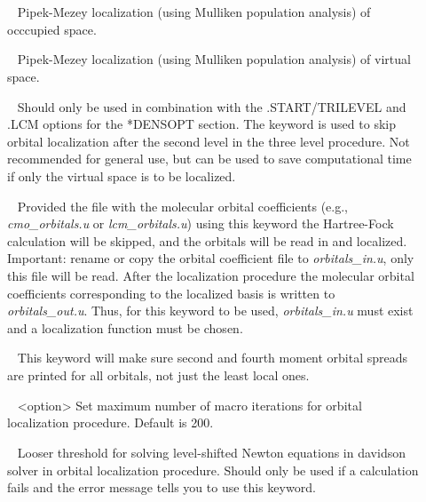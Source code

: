 \begin{description}
\item[]\verb| | \newline
Pipek-Mezey localization (using Mulliken population analysis) of occcupied space.

\item[]\verb| | \newline
Pipek-Mezey localization (using Mulliken population analysis) of virtual space.

\item[]\verb| | \newline
Should only be used in combination with the .START/TRILEVEL and  .LCM options for the *DENSOPT section. The keyword is used to skip orbital localization after the second level in the three level procedure. Not recommended for general use, but can be used to save  computational time if only the virtual space is to be localized.  

\item[]\verb| | \newline
Provided the file with the molecular orbital coefficients (e.g., \textit{cmo\_orbitals.u} or \textit{lcm\_orbitals.u}) using this keyword the Hartree-Fock calculation will be skipped, and the orbitals will be read in and localized. Important: rename or copy the orbital coefficient file to \textit{orbitals\_in.u}, only this file will be read. After the localization procedure the molecular orbital coefficients corresponding to the localized basis is written to \textit{orbitals\_out.u}. Thus, for this keyword to be used, \textit{orbitals\_in.u} must exist and a localization function must be chosen.


\item[]\verb| | \newline
This keyword will make sure second and fourth moment orbital spreads are printed for all orbitals, not just the least local ones.


\item[]\verb| | \newline
<option>
Set maximum number of macro iterations for orbital localization procedure. Default is 200. 


\item[]\verb| | \newline
Looser threshold for solving level-shifted Newton equations in davidson solver in orbital localization procedure. Should only be used if a calculation fails and the error message tells you to use this keyword.


\end{description}
